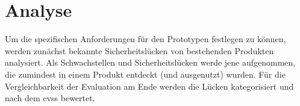 \section{Analyse}
\label{sec:analysis}
	Um die spezifischen Anforderungen für den Prototypen festlegen zu können, werden zunächst bekannte Sicherheitslücken von bestehenden Produkten analysiert. 
	Als Schwachstellen und Sicherheitslücken werde jene aufgenommen, die zumindest in einem Produkt entdeckt (und ausgenutzt) wurden.
	Für die Vergleichbarkeit der Evaluation am Ende werden die Lücken kategorisiert und nach dem \gls{cvss} bewertet.
